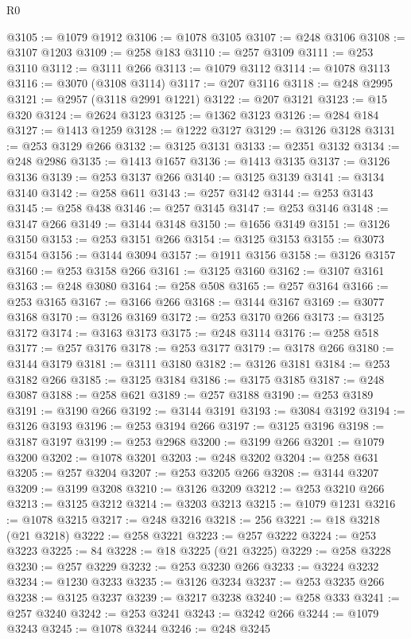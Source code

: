 \begin{lexlean}{R0}
\begin{coremodule}
@3105 := @1079 @1912
@3106 := @1078 @3105
@3107 := @248 @3106
@3108 := @3107 @1203
@3109 := @258 @183
@3110 := @257 @3109
@3111 := @253 @3110
@3112 := @3111 @266
@3113 := @1079 @3112
@3114 := @1078 @3113
@3116 := @3070 (@3108 @3114)
@3117 := @207 @3116
@3118 := @248 @2995
@3121 := @2957 (@3118 @2991 @1221)
@3122 := @207 @3121
@3123 := @15 @320
@3124 := @2624 @3123
@3125 := @1362 @3123
@3126 := @284 @184
@3127 := @1413 @1259
@3128 := @1222 @3127
@3129 := @3126 @3128
@3131 := @253 @3129 @266
@3132 := @3125 @3131
@3133 := @2351 @3132
@3134 := @248 @2986
@3135 := @1413 @1657
@3136 := @1413 @3135
@3137 := @3126 @3136
@3139 := @253 @3137 @266
@3140 := @3125 @3139
@3141 := @3134 @3140
@3142 := @258 @611
@3143 := @257 @3142
@3144 := @253 @3143
@3145 := @258 @438
@3146 := @257 @3145
@3147 := @253 @3146
@3148 := @3147 @266
@3149 := @3144 @3148
@3150 := @1656 @3149
@3151 := @3126 @3150
@3153 := @253 @3151 @266
@3154 := @3125 @3153
@3155 := @3073 @3154
@3156 := @3144 @3094
@3157 := @1911 @3156
@3158 := @3126 @3157
@3160 := @253 @3158 @266
@3161 := @3125 @3160
@3162 := @3107 @3161
@3163 := @248 @3080
@3164 := @258 @508
@3165 := @257 @3164
@3166 := @253 @3165
@3167 := @3166 @266
@3168 := @3144 @3167
@3169 := @3077 @3168
@3170 := @3126 @3169
@3172 := @253 @3170 @266
@3173 := @3125 @3172
@3174 := @3163 @3173
@3175 := @248 @3114
@3176 := @258 @518
@3177 := @257 @3176
@3178 := @253 @3177
@3179 := @3178 @266
@3180 := @3144 @3179
@3181 := @3111 @3180
@3182 := @3126 @3181
@3184 := @253 @3182 @266
@3185 := @3125 @3184
@3186 := @3175 @3185
@3187 := @248 @3087
@3188 := @258 @621
@3189 := @257 @3188
@3190 := @253 @3189
@3191 := @3190 @266
@3192 := @3144 @3191
@3193 := @3084 @3192
@3194 := @3126 @3193
@3196 := @253 @3194 @266
@3197 := @3125 @3196
@3198 := @3187 @3197
@3199 := @253 @2968
@3200 := @3199 @266
@3201 := @1079 @3200
@3202 := @1078 @3201
@3203 := @248 @3202
@3204 := @258 @631
@3205 := @257 @3204
@3207 := @253 @3205 @266
@3208 := @3144 @3207
@3209 := @3199 @3208
@3210 := @3126 @3209
@3212 := @253 @3210 @266
@3213 := @3125 @3212
@3214 := @3203 @3213
@3215 := @1079 @1231
@3216 := @1078 @3215
@3217 := @248 @3216
@3218 := 256
@3221 := @18 @3218 (@21 @3218)
@3222 := @258 @3221
@3223 := @257 @3222
@3224 := @253 @3223
@3225 := 84
@3228 := @18 @3225 (@21 @3225)
@3229 := @258 @3228
@3230 := @257 @3229
@3232 := @253 @3230 @266
@3233 := @3224 @3232
@3234 := @1230 @3233
@3235 := @3126 @3234
@3237 := @253 @3235 @266
@3238 := @3125 @3237
@3239 := @3217 @3238
@3240 := @258 @333
@3241 := @257 @3240
@3242 := @253 @3241
@3243 := @3242 @266
@3244 := @1079 @3243
@3245 := @1078 @3244
@3246 := @248 @3245

\end{coremodule}
\end{lexlean}
